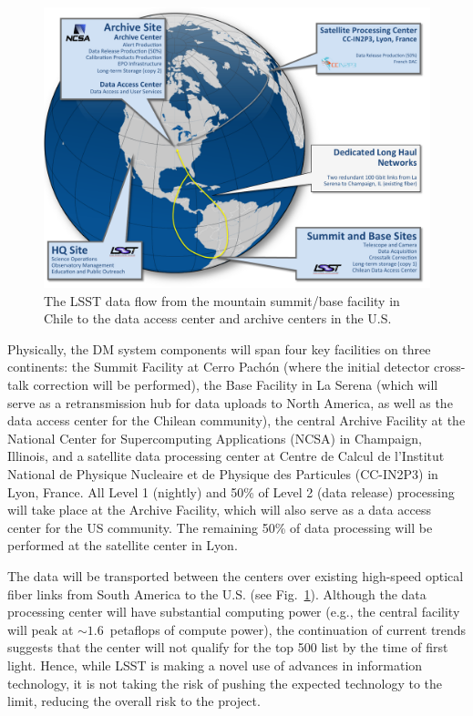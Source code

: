\documentclass[11pt,twoside]{article}
\begin{document}
\begin{figure}
%
%
\hskip 0.25in
\includegraphics[width=0.95\hsize,clip]{DMX2.pdf}
\caption{The LSST data flow from the mountain summit/base facility in
Chile to the data access center and archive centers in the U.S.}
\label{Fig:DM2}
\end{figure}

Physically, the DM system components will span four key facilities on three
continents: the Summit Facility at  Cerro Pach\'on (where the initial
detector cross-talk 
correction will be performed), the Base Facility in La Serena (which will serve
as a retransmission hub for data 
uploads to North America, as well as the data access center for the Chilean
community), the central Archive Facility at the National Center
for Supercomputing Applications (NCSA) in Champaign, Illinois, and a
satellite data processing center at Centre de Calcul de l'Institut National 
de Physique Nucleaire et de Physique des Particules (CC-IN2P3) in Lyon, France.
All Level 1 (nightly) and 50\% of Level 2 (data release) processing will take place at the
Archive Facility, which will also serve as a data access center
for the US community. The remaining 50\% of data processing will be performed at
the satellite center in Lyon.

The data will be transported between the centers over existing high-speed optical fiber 
links from South America to the U.S. (see Fig.~\ref{Fig:DM2}).
Although the data processing center will have substantial computing 
power (e.g., the central facility will peak at $\sim 1.6$~petaflops of 
compute power), the continuation of current trends suggests that the center will 
not qualify for the top 500 list by the time of first light.
Hence, while LSST is making a novel use of advances in information technology, 
it is not taking the risk of pushing the expected technology to the limit, reducing
the overall risk to the project. 
\\
\end{document}
